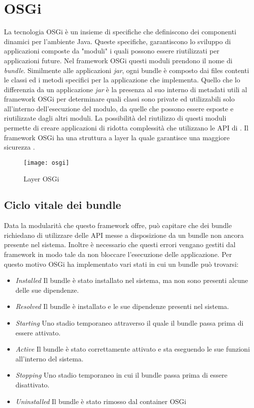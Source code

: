 \section{OSGi}
La tecnologia OSGi è un insieme di specifiche che definiscono dei componenti
dinamici per l'ambiente Java. Queste specifiche, garantiscono lo sviluppo di
applicazioni composte da "moduli" i quali possono essere riutilizzati per
applicazioni future. Nel framework OSGi questi moduli prendono il nome di
\emph{bundle}. Similmente  alle applicazioni \emph{jar}, ogni bundle è composto
dai files contenti le classi ed i metodi specifici per la applicazione che
implementa. Quello che lo differenzia da un applicazione \emph{jar} è la
presenza al suo interno di metadati utili al framework OSGi per determinare
quali classi sono private ed utilizzabili solo all'interno dell'esecuzione del
modulo, da quelle che possono essere esposte e riutilizzate dagli altri moduli.
La possibilità del riutilizzo di questi moduli permette di
creare applicazioni di ridotta complessità che utilizzano le API di .
Il framework OSGi ha una struttura a layer la quale garantisce una maggiore
sicurezza .
\begin{figure}[h]
\centering 
\texttt{[image: osgi]}
\caption{Layer OSGi}
\label{}
\end{figure}

\subsection{Ciclo vitale dei bundle}
Data la modularità che questo framework offre, può capitare che dei bundle
richiedano di utilizzare delle API messe a disposizione da un bundle non ancora
presente nel sistema. Inoltre è necessario che questi errori vengano gestiti dal
framework in modo tale da non bloccare l'esecuzione delle applicazione.
Per questo motivo OSGi ha implementato vari stati in cui un bundle può trovarsi:
\begin{itemize}
        \item   \textit{Installed} Il bundle è stato installato nel sistema, ma
                non sono presenti alcune delle sue dipendenze.
        \item   \textit{Resolved} Il bundle è installato e le sue dipendenze
                presenti nel sistema.
        \item   \textit{Starting} Uno stadio temporaneo attraverso il quale il
                bundle passa prima di essere attivato.
        \item   \textit{Active} Il bundle è stato correttamente attivato e sta
                eseguendo le sue funzioni all'interno del sistema.
        \item   \textit{Stopping} Uno stadio temporaneo in cui il bundle passa
                prima di essere disattivato.
        \item   \textit{Uninstalled} Il bundle è stato rimosso dal container
                OSGi
\end{itemize}
